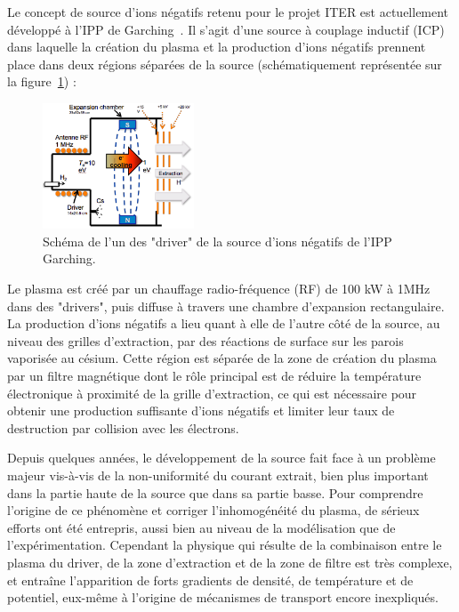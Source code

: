 \begin{refsection}
Le concept de source d'ions négatifs retenu pour le projet ITER est
actuellement développé à l'IPP de Garching~\parencite{Hemsworth}. Il s'agit
d'une source à couplage inductif (ICP) dans laquelle la création du plasma et la
production d'ions négatifs prennent place dans deux régions séparées de la
source (schématiquement représentée sur la
figure~\ref{IPPIonSource}) :
\begin{figure}[htbp]
\centering
\includegraphics[width=0.4\textwidth]{figures/sourceIPP.png}
{\caption{Schéma de l'un des "driver" de la source d'ions
négatifs de l'IPP Garching.}\label{IPPIonSource}}
\end{figure}

 Le plasma est créé par un chauffage radio-fréquence
(RF) de 100 kW à 1MHz dans des "drivers", puis diffuse à travers une chambre
d'expansion rectangulaire. La production d'ions négatifs a lieu quant à elle de
l'autre côté de la source, au niveau des grilles d'extraction, par des
réactions de surface sur les parois vaporisée au césium.
Cette région est séparée de la zone de création du plasma par un filtre magnétique dont le rôle
principal est de réduire la température électronique à proximité de la grille
d'extraction, ce qui est nécessaire pour obtenir une production suffisante
d'ions négatifs et limiter leur taux de destruction par collision avec les
électrons. 

Depuis quelques années, le développement de la source fait
face à un problème majeur vis-à-vis de la non-uniformité du courant extrait, bien plus
important dans la partie haute de la source que dans sa partie basse. 
Pour comprendre l'origine de ce phénomène et corriger l'inhomogénéité du plasma,
de sérieux efforts ont été entrepris, aussi bien au niveau de la modélisation que
de l'expérimentation. Cependant la physique qui résulte de la combinaison entre
le plasma du driver, de la zone d'extraction et de la zone de filtre est très
complexe, et entraîne l'apparition de forts gradients de densité,
de température et de potentiel, eux-même à l'origine de mécanismes de transport
encore inexpliqués.





\end{refsection}
